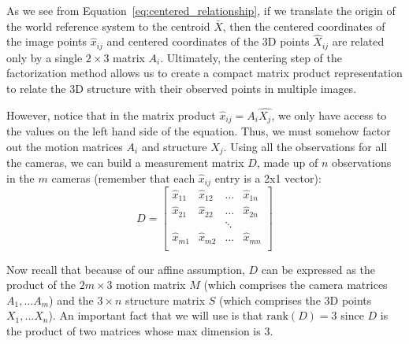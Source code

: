 \documentclass[a4paper, 12pt]{article}
\numberwithin{equation}{section}
\begin{document}
As we see from Equation~\ref{eq:centered_relationship}, if we translate the origin of the world reference system to the centroid $\bar{X}$, then the centered coordinates of the image points $\hat{x}_{ij}$ and centered coordinates of the 3D points $\hat{X}_{ij}$ are related only by a single $2\times 3$ matrix $A_i$. Ultimately, the centering step of the factorization method allows us to create a compact matrix product representation to relate the 3D structure with their observed points in multiple images.

However, notice that in the matrix product $\hat{x}_{ij} = A_i\hat{X_j}$, we only have access to the values on the left hand side of the equation. Thus, we must somehow factor out the motion matrices $A_i$ and structure $X_j$. Using all the observations for all the cameras, we can build a measurement matrix $D$, made up of $n$ observations in the $m$ cameras (remember that each $\hat{x}_{ij}$ entry is a 2x1 vector):
\begin{equation}
    D = \begin{bmatrix}
        \hat{x}_{11} & \hat{x}_{12} & \hdots & \hat{x}_{1n}\\
        \hat{x}_{2  1} & \hat{x}_{22} & \hdots & \hat{x}_{2n}\\
        & & \ddots & \\
        \hat{x}_{m1} & \hat{x}_{m2} & \hdots & \hat{x}_{mn}\\
    \end{bmatrix}
\end{equation}

Now recall that because of our affine assumption, $D$ can be expressed as the product of the $2m\times3$ motion matrix $M$ (which comprises the camera matrices $A_1, \ldots A_m$) and the $3\times n$ structure matrix $S$ (which comprises the 3D points $X_1, \ldots X_n$). An important fact that we will use is that $\mathrm{rank}(D) = 3$ since $D$ is the product of two matrices whose max dimension is 3. 
\end{document}
